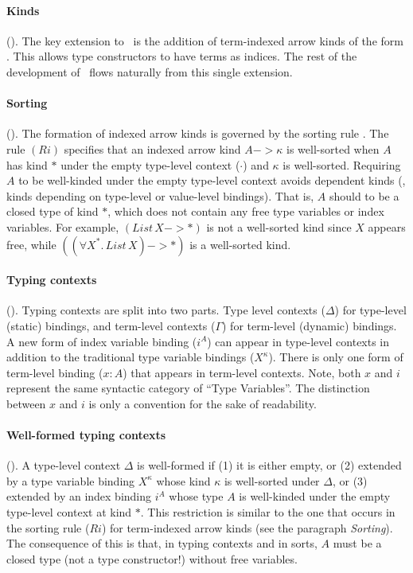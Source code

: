 \paragraph{Kinds\!}().\;
The key extension to \Fw\ is the addition of term-indexed arrow kinds of
the form . This allows type constructors to have terms
as indices. The rest of the development of \Fi\ flows naturally from
this single extension.

\paragraph{Sorting\!}().\; \label{sorting}
The formation of indexed arrow kinds is
governed by the sorting rule . The rule $(Ri)$ specifies that
an indexed arrow kind $A -> \kappa$ is well-sorted when $A$ has kind $*$
under the empty type-level context ($\cdot$) and $\kappa$ is well-sorted.
Requiring $A$ to be well-kinded under the empty type-level context avoids
dependent kinds (\ie, kinds depending on type-level or value-level bindings).
That is, $A$ should to be a closed type of kind $*$,
which does not contain any free type variables or index variables.
For example, $(\textit{List}\,X -> *)$ is not a well-sorted kind since $X$
appears free, while $((\forall X^{*}\!.\,\textit{List}\,X) -> *)$ is a well-sorted kind.

\paragraph{Typing contexts\!}().\;
Typing contexts are split into two parts.
Type level contexts ($\Delta$) for type-level (static) bindings,
and term-level contexts ($\Gamma$) for term-level (dynamic) bindings.
A new form of index variable binding ($i^A$) can appear in type-level contexts
in addition to the traditional type variable bindings ($X^\kappa$).
There is only one form of term-level binding ($x:A$) that appears in
term-level contexts. Note, both $x$ and $i$ represent the same
syntactic category of ``Type Variables''. The distinction between
$x$ and $i$ is only a convention for the sake of readability.

\paragraph{Well-formed typing contexts\!}().\;
A type-level context $\Delta$ is well-formed if (1) it is either empty,
or (2) extended by a type variable binding $X^\kappa$ whose kind $\kappa$ is
well-sorted under $\Delta$, or (3) extended by an index binding $i^A$
whose type $A$ is well-kinded under the empty type-level context at kind $*$.
This restriction is similar to the one that occurs in the sorting rule ($Ri$)
for term-indexed arrow kinds (see the paragraph {\textit{Sorting}}).
The consequence of this is that, in typing contexts and in sorts,
$A$ must be a closed type (not a type constructor!) without free variables.

